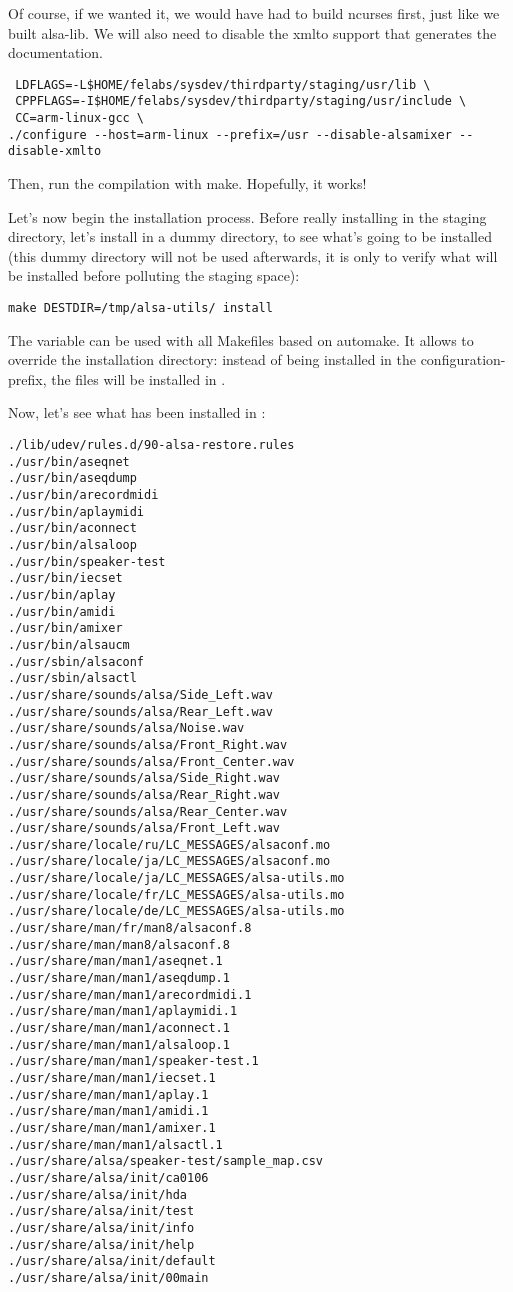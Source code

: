 Of course, if we wanted it, we would have had to build ncurses first,
just like we built alsa-lib. We will also need to disable the xmlto
support that generates the documentation.

\begin{verbatim}
 LDFLAGS=-L$HOME/felabs/sysdev/thirdparty/staging/usr/lib \
 CPPFLAGS=-I$HOME/felabs/sysdev/thirdparty/staging/usr/include \
 CC=arm-linux-gcc \
./configure --host=arm-linux --prefix=/usr --disable-alsamixer --disable-xmlto
\end{verbatim}

Then, run the compilation with make. Hopefully, it works!

Let's now begin the installation process.  Before really installing in
the staging directory, let's install in a dummy directory, to see
what's going to be installed (this dummy directory will not be used
afterwards, it is only to verify what will be installed before
polluting the staging space):

\begin{verbatim}
make DESTDIR=/tmp/alsa-utils/ install
\end{verbatim}

The  variable can be used with all Makefiles based on
automake. It allows to override the installation directory: instead of
being installed in the configuration-prefix, the files will be
installed in \code{DESTDIR/configuration-prefix}.

Now, let's see what has been installed in :

\begin{verbatim}
./lib/udev/rules.d/90-alsa-restore.rules
./usr/bin/aseqnet
./usr/bin/aseqdump
./usr/bin/arecordmidi
./usr/bin/aplaymidi
./usr/bin/aconnect
./usr/bin/alsaloop
./usr/bin/speaker-test
./usr/bin/iecset
./usr/bin/aplay
./usr/bin/amidi
./usr/bin/amixer
./usr/bin/alsaucm
./usr/sbin/alsaconf
./usr/sbin/alsactl
./usr/share/sounds/alsa/Side_Left.wav
./usr/share/sounds/alsa/Rear_Left.wav
./usr/share/sounds/alsa/Noise.wav
./usr/share/sounds/alsa/Front_Right.wav
./usr/share/sounds/alsa/Front_Center.wav
./usr/share/sounds/alsa/Side_Right.wav
./usr/share/sounds/alsa/Rear_Right.wav
./usr/share/sounds/alsa/Rear_Center.wav
./usr/share/sounds/alsa/Front_Left.wav
./usr/share/locale/ru/LC_MESSAGES/alsaconf.mo
./usr/share/locale/ja/LC_MESSAGES/alsaconf.mo
./usr/share/locale/ja/LC_MESSAGES/alsa-utils.mo
./usr/share/locale/fr/LC_MESSAGES/alsa-utils.mo
./usr/share/locale/de/LC_MESSAGES/alsa-utils.mo
./usr/share/man/fr/man8/alsaconf.8
./usr/share/man/man8/alsaconf.8
./usr/share/man/man1/aseqnet.1
./usr/share/man/man1/aseqdump.1
./usr/share/man/man1/arecordmidi.1
./usr/share/man/man1/aplaymidi.1
./usr/share/man/man1/aconnect.1
./usr/share/man/man1/alsaloop.1
./usr/share/man/man1/speaker-test.1
./usr/share/man/man1/iecset.1
./usr/share/man/man1/aplay.1
./usr/share/man/man1/amidi.1
./usr/share/man/man1/amixer.1
./usr/share/man/man1/alsactl.1
./usr/share/alsa/speaker-test/sample_map.csv
./usr/share/alsa/init/ca0106
./usr/share/alsa/init/hda
./usr/share/alsa/init/test
./usr/share/alsa/init/info
./usr/share/alsa/init/help
./usr/share/alsa/init/default
./usr/share/alsa/init/00main
\end{verbatim}


